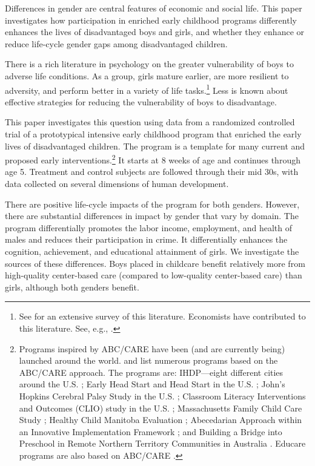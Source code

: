 Differences in gender are central features of economic and social life. This paper investigates how participation in enriched early childhood programs differently enhances the lives of disadvantaged boys and girls, and whether they enhance or reduce life-cycle gender gaps among disadvantaged children.

There is a rich literature in psychology on the greater vulnerability of boys to adverse life conditions. As a group, girls mature earlier, are more resilient to adversity, and perform better in a variety of life tasks.\footnote{See \cite{Schore_2017_IMHJ} for an extensive survey of this literature. Economists have contributed to this literature. See, e.g., \cite{Bertrand_Pan_2013_AEJAE,Autor-etal_2015_Family-Disadvantage}.} Less is known about effective strategies for reducing the vulnerability of boys to disadvantage. 

This paper investigates this question using data from a randomized controlled trial of a prototypical intensive early childhood program that enriched the early lives of disadvantaged children. The program is a template for many current and proposed early interventions.\footnote{Programs inspired by ABC/CARE have been (and are currently being) launched around the world. \citet{Sparling_2010_Highlights} and \citet{Ramey_Ramey_Lanzi_2014_Interventions} list numerous programs based on the ABC/CARE approach. The programs are: IHDP---eight different cities around the U.S. \citep{Spiker-etal_1997_Helping}; Early Head Start and Head Start in the U.S. \citep{Schneider_McDonald-eds_2007_Scale-Up_Vol-1}; John's Hopkins Cerebral Palsy Study in the U.S. \citep{Sparling_2010_Highlights}; Classroom Literacy Interventions and Outcomes (CLIO) study in the U.S. \citep{Sparling_2010_Highlights}; Massachusetts Family Child Care Study \citep{Collins_etal_2010_Massachusetts-Study}; Healthy Child Manitoba Evaluation \citep{Healthy_Child_Manitoba_2015_Starting-Early}; Abecedarian Approach within an Innovative Implementation Framework \citep{Jensen_Nielsen_2016_ABC-Programme-Pilot}; and Building a Bridge into Preschool in Remote Northern Territory Communities in Australia \citep{UMonash_Dataset_2015_URL}. Educare programs are also based on ABC/CARE \citep{Educare_2014_Research_Agenda,Yazejian_Bryant_2012_Educare}.} It starts at 8 weeks of age and continues through age 5. Treatment and control subjects are followed through their mid 30s, with data collected on several dimensions of human development.

There are positive life-cycle impacts of the program for both genders. However, there are substantial differences in impact by gender that vary by domain. The program differentially promotes the labor income, employment, and health of males and reduces their participation in crime. It differentially enhances the cognition, achievement, and educational attainment of girls. We investigate the sources of these differences. Boys placed in childcare benefit relatively more from high-quality center-based care (compared to low-quality center-based care) than girls, although both genders benefit. 

